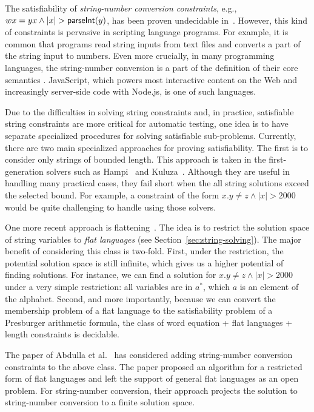 The satisfiability of \emph{string-number conversion constraints}, e.g., $wx=yx \wedge |x| > \textsf{parseInt}(y)$, has been proven undecidable in~\cite{DayGHMN18}. 
However, this kind of constraints is pervasive in scripting language programs. 
For example, it is common that programs read string inputs from text files and converts a part of the string input to numbers.
Even more crucially, in many programming languages, the string-number conversion is a part of the definition of their core semantics . 
JavaScript, which powers most interactive content on the Web and increasingly server-side code with Node.js, is one of such languages. 

Due to the difficulties in solving string constraints and, in practice, satisfiable string constraints are more critical for automatic testing, one idea is to have separate specialized procedures for solving satisfiable sub-problems. 
Currently, there are two main specialized approaches for proving satisfiability.
The first is to consider only strings of bounded length.
This approach is taken in the first-generation solvers such as Hampi~\cite{KiezunGAGHE12} and Kuluza~\cite{SaxenaAHMMS10}.
Although they are useful in handling many practical cases, they fail short when the all string solutions exceed the selected bound.
For example, a constraint of the form $x.y \neq z  \wedge |x| > 2000$ would be quite challenging to handle using those solvers.

One more recent approach is flattening~\cite{Parosh:20:PLDI,AbdullaACDHRR18,AbdullaACDHRR17}.
The idea is to restrict the solution space of string variables to 
\emph{flat languages} (see Section~\ref{sec:string-solving}). 
The major benefit of considering this class is two-fold.
First, under the restriction, the potential solution space is still infinite, which gives us a higher potential of finding solutions.
For instance, we can find a solution for $x.y \neq z  \wedge |x| > 2000$ under a very simple restriction: all variables are in $a^*$, which $a$ is an element of the alphabet.
Second, and more importantly, because we can convert the membership problem of a flat language to the satisfiability problem of a Presburger arithmetic formula, the class of word equation + flat languages + length constraints is decidable.

The paper of Abdulla et al.~\cite{Parosh:20:PLDI} has considered adding string-number conversion constraints to the above class.
The paper proposed an algorithm for a restricted form of flat languages and left the support of general flat languages as an open problem.
For string-number conversion, their approach projects the solution to string-number conversion to
a finite solution space.

